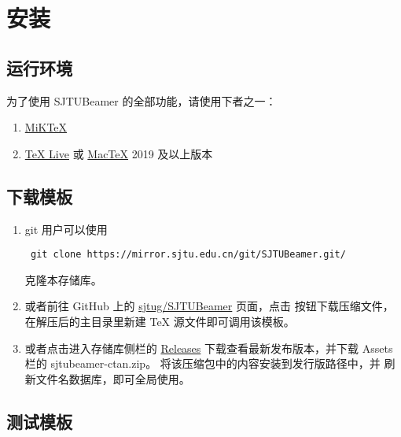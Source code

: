 \documentclass[
    UTF8,
    heading=true,
    12pt,
    a4paper
]{ctexrep}
\def\themename{\textsf{SJTUBeamer}}
\begin{document}
\chapter{安装}

\section{运行环境}

为了使用 \themename{} 的全部功能，请使用下者之一：
\begin{enumerate}
  \item \href{https://mirrors.sjtug.sjtu.edu.cn/ctan/systems/win32/miktex/setup/windows-x64/}{MiK\TeX{}}
  \item \href{https://mirrors.sjtug.sjtu.edu.cn/ctan/systems/texlive/Images/}
        {\TeX{} Live} 或
        \href{https://mirrors.sjtug.sjtu.edu.cn/ctan/systems/mac/mactex/}
        {Mac\TeX{}} 2019 及以上版本
\end{enumerate}

\section{下载模板}

\begin{enumerate}
  \item git 用户可以使用
        \begin{verbatim} git clone https://mirror.sjtu.edu.cn/git/SJTUBeamer.git/ \end{verbatim}
        克隆本存储库。
  \item 或者前往 GitHub 上的
        \faGithub{}
        \href{https://github.com/sjtug/SJTUBeamer}{sjtug/SJTUBeamer} 页面，点击
        按钮下载压缩文件，在解压后的主目录里新建 \TeX{}
        源文件即可调用该模板。
  \item 或者点击进入存储库侧栏的
        \href{https://github.com/sjtug/SJTUBeamer/releases}{\textsf{Releases}}
        下载查看最新发布版本，并下载 \textsf{Assets} 栏的
        \textsf{sjtubeamer-ctan.zip}。
        将该压缩包中的内容安装到发行版路径中，并
        刷新文件名数据库，即可全局使用。
\end{enumerate}

\section{测试模板}
\end{document}

